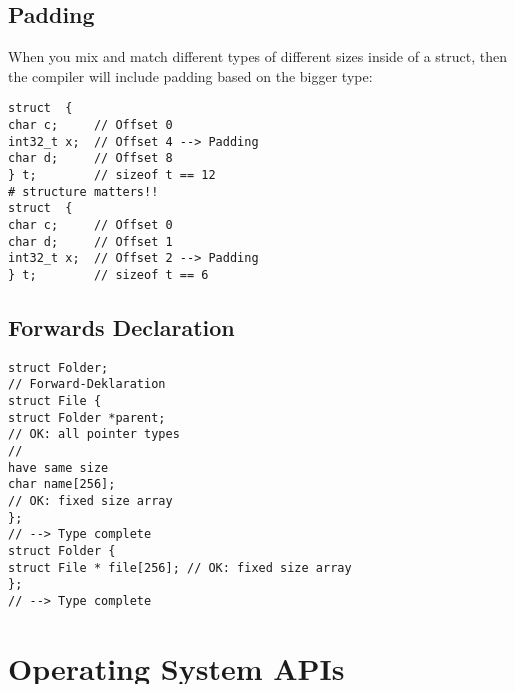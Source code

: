 \documentclass[main.tex,fontsize=8pt,paper=a4,paper=portrait,DIV=calc,]{scrartcl}
\begin{document}
\subsection{Padding}
When you mix and match different types of different sizes inside of a struct, then the compiler will include padding based on the bigger type: \newline
\begin{lstlisting}
struct  {
char c;     // Offset 0
int32_t x;  // Offset 4 --> Padding
char d;     // Offset 8
} t;        // sizeof t == 12
# structure matters!!
struct  {
char c;     // Offset 0
char d;     // Offset 1
int32_t x;  // Offset 2 --> Padding
} t;        // sizeof t == 6
\end{lstlisting}

\subsection{Forwards Declaration}
\begin{lstlisting}
struct Folder;
// Forward-Deklaration
struct File {
struct Folder *parent;
// OK: all pointer types
//
have same size
char name[256];
// OK: fixed size array
};
// --> Type complete
struct Folder {
struct File * file[256]; // OK: fixed size array
};
// --> Type complete
\end{lstlisting}

\section{Operating System APIs}

\subsection{Basic features of an Operating system}
\begin{itemize}
\item \textcolor{purple}{abstraction and portability}\newline
  \begin{itemize}
  \item \textcolor{black}{define generic APIs that work on all (as many as possible) devices}
  \item \textcolor{black}{define abstractions that we don't care about -> how are files stored on the disk?}
  \end{itemize} 
\item \textcolor{purple}{Isolation and Resource Management}\newline
  \begin{itemize}
    \item Isolate each usecase from each other -> posx
  \item \textcolor{black}{Runtime (make it blazingly fast)}
  \item \textcolor{black}{Memory Management}
  \item \textcolor{black}{Secondary Storage handling}
  \end{itemize} 
\item \textcolor{purple}{Security}
\end{itemize} 
\end{document}

